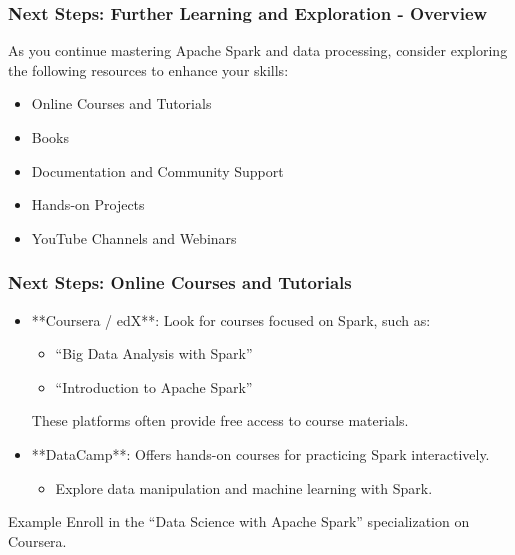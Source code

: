 \documentclass[aspectratio=169]{beamer}
\begin{document}
\begin{frame}[fragile]
    \frametitle{Next Steps: Further Learning and Exploration - Overview}
    As you continue mastering Apache Spark and data processing, consider exploring the following resources to enhance your skills:
    \begin{itemize}
        \item Online Courses and Tutorials
        \item Books
        \item Documentation and Community Support
        \item Hands-on Projects
        \item YouTube Channels and Webinars
    \end{itemize}
\end{frame}

\begin{frame}[fragile]
    \frametitle{Next Steps: Online Courses and Tutorials}
    \begin{itemize}
        \item **Coursera / edX**: Look for courses focused on Spark, such as:
        \begin{itemize}
            \item ``Big Data Analysis with Spark''
            \item ``Introduction to Apache Spark''
        \end{itemize}
        These platforms often provide free access to course materials.
        
        \item **DataCamp**: Offers hands-on courses for practicing Spark interactively. 
        \begin{itemize}
            \item Explore data manipulation and machine learning with Spark.
        \end{itemize}
    \end{itemize}
    
    \begin{block}{Example}
        Enroll in the ``Data Science with Apache Spark'' specialization on Coursera.
    \end{block}
\end{frame}
\end{document}
